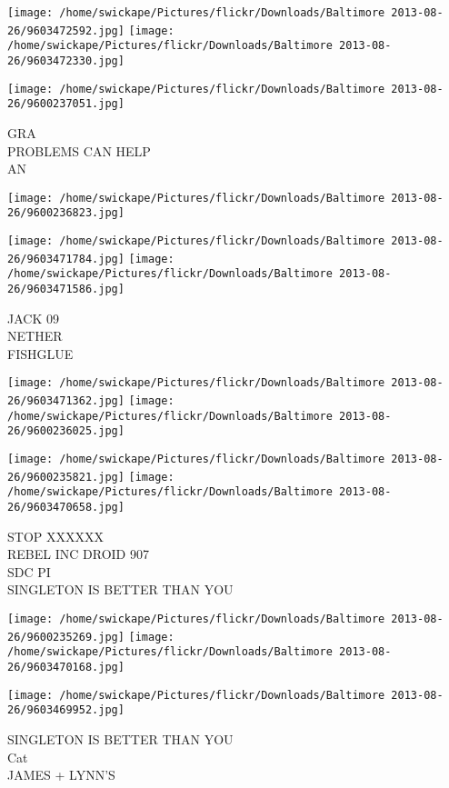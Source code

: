 \documentclass[10pt,letterpaper]{article}
\begin{document}
\texttt{[image: /home/swickape/Pictures/flickr/Downloads/Baltimore 2013-08-26/9603472592.jpg]}
\texttt{[image: /home/swickape/Pictures/flickr/Downloads/Baltimore 2013-08-26/9603472330.jpg]}

\texttt{[image: /home/swickape/Pictures/flickr/Downloads/Baltimore 2013-08-26/9600237051.jpg]}

GRA\\
PROBLEMS CAN HELP\\
AN\\
\pagebreak

\texttt{[image: /home/swickape/Pictures/flickr/Downloads/Baltimore 2013-08-26/9600236823.jpg]}

\vspace{0.25in}
\texttt{[image: /home/swickape/Pictures/flickr/Downloads/Baltimore 2013-08-26/9603471784.jpg]}
\texttt{[image: /home/swickape/Pictures/flickr/Downloads/Baltimore 2013-08-26/9603471586.jpg]}

JACK 09\\
NETHER\\
FISHGLUE\\
\pagebreak

\texttt{[image: /home/swickape/Pictures/flickr/Downloads/Baltimore 2013-08-26/9603471362.jpg]}
\texttt{[image: /home/swickape/Pictures/flickr/Downloads/Baltimore 2013-08-26/9600236025.jpg]}

\texttt{[image: /home/swickape/Pictures/flickr/Downloads/Baltimore 2013-08-26/9600235821.jpg]}
\texttt{[image: /home/swickape/Pictures/flickr/Downloads/Baltimore 2013-08-26/9603470658.jpg]}

STOP XXXXXX\\
REBEL INC DROID 907\\
SDC PI\\
SINGLETON IS BETTER THAN YOU\\
\pagebreak

\texttt{[image: /home/swickape/Pictures/flickr/Downloads/Baltimore 2013-08-26/9600235269.jpg]}
\texttt{[image: /home/swickape/Pictures/flickr/Downloads/Baltimore 2013-08-26/9603470168.jpg]}

\texttt{[image: /home/swickape/Pictures/flickr/Downloads/Baltimore 2013-08-26/9603469952.jpg]}

SINGLETON IS BETTER THAN YOU\\
Cat\\
JAMES + LYNN'S\\
\pagebreak
\end{document}
